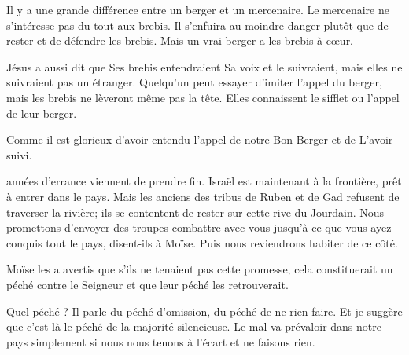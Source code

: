 Il y a une grande différence entre un berger et un mercenaire.
 Le mercenaire ne s'intéresse pas du tout aux brebis.
 Il s'enfuira au moindre danger plutôt que de rester et de défendre les brebis.
 Mais un vrai berger a les brebis à cœur.


Jésus a aussi dit que Ses brebis entendraient Sa voix et le suivraient,
 mais elles ne suivraient pas un étranger.
 Quelqu'un peut essayer d'imiter l'appel du berger,
 mais les brebis ne lèveront même pas la tête.
 Elles connaissent le sifflet ou l'appel de leur berger.

Comme il est glorieux d'avoir entendu l'appel de notre Bon Berger
 et de L'avoir suivi. 

\dvrule






 années d'errance viennent de prendre fin.
 Israël est maintenant à la frontière, prêt à entrer dans le pays.
 Mais les anciens des tribus de Ruben et de Gad
 refusent de traverser la rivière;
 ils se contentent de rester sur cette rive du Jourdain.
 \og Nous promettons d'envoyer des troupes combattre avec vous
 jusqu'à ce que vous ayez conquis tout le pays, \fg{} disent-ils à Moïse.
 \og Puis nous reviendrons habiter de ce côté. \fg{}

Moïse les a avertis que s'ils ne tenaient pas cette promesse,
 cela constituerait un péché contre le Seigneur
 \ocadr{}et que leur péché les retrouverait.

Quel péché ? Il parle du péché d'omission, du péché de ne rien faire.
 Et je suggère que c'est là le péché de la majorité silencieuse.
 Le mal va prévaloir dans notre pays simplement
 si nous nous tenons à l'écart et ne faisons rien.


